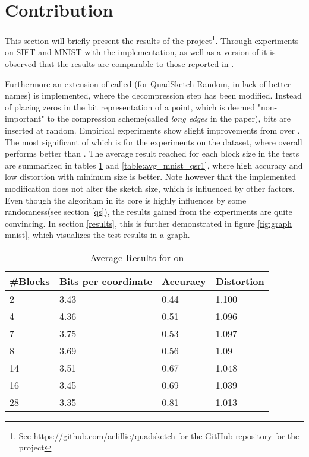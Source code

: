 \section{Contribution}
\label{contribution}
This section will briefly present the results of the project\footnote{See \url{https://github.com/aelillie/quadsketch} for the GitHub repository for the project}. Through experiments on SIFT and MNIST with the \qs{} implementation, as well as a version of \gr{} it is observed that the results are comparable to those reported in \cite{wagner17}. 

Furthermore an extension of \qs{} called \qsr{} (for QuadSketch Random, in lack of better names) is implemented, where the decompression step has been modified. Instead of placing zeros in the bit representation of a point, which is deemed "non-important" to the compression scheme(called \textit{long edges} in the paper), bits are inserted at random. Empirical experiments show slight improvements from \qsr{} over \qs{}. The most significant of which is for the experiments on the \mnist{} dataset, where \qsr{} overall performs better than \qs{}. The average result reached for each block size in the tests are summarized in tables \ref{table:avg_mnist_qs1} and \ref{table:avg_mnist_qsr1}, where high accuracy and low distortion with minimum size is better. Note however that the implemented modification does not alter the sketch size, which is influenced by other factors. Even though the algorithm in its core is highly influences by some randomness(see section \ref{qs}), the results gained from the experiments are quite convincing. In section \ref{results}, this is further demonstrated in figure \ref{fig:graph mnist}, which visualizes the test results in a graph.


\begin{table}[h]
	\centering
	\caption{Average Results for \qs{} on \mnist{}}
	\label{table:avg_mnist_qs1}
	\begin{tabular}{l l l l}
		\hline
		\#Blocks & Bits per coordinate & Accuracy  & Distortion \\ \hline
		2 & 3.43 & 0.44 & 1.100  \\
		4 & 4.36 & 0.51 & 1.096  \\
		7 & 3.75 & 0.53 & 1.097 \\
		8 & 3.69 & 0.56 & 1.09 \\
		14 & 3.51 & 0.67 & 1.048 \\
		16 & 3.45 & 0.69 & 1.039 \\
		28 & 3.35 & 0.81 & 1.013 \\
		\hline
	\end{tabular}
\end{table}

